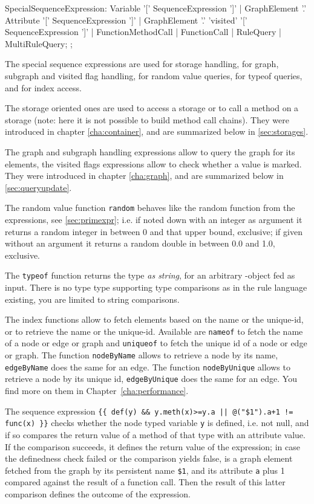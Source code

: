 \begin{rail}
  SpecialSequenceExpression:
    Variable '[' SequenceExpression ']' |
    GraphElement '.' Attribute '[' SequenceExpression ']' |
    GraphElement '.' 'visited' '[' SequenceExpression ']' |
    FunctionMethodCall |
    FunctionCall |
		RuleQuery |
		MultiRuleQuery;
  ;
\end{rail}

The special sequence expressions are used for storage handling, for graph, subgraph and visited flag handling, for random value queries, for typeof queries, and for index access.

The storage oriented ones are used to access a storage or to call a method on a storage (note: here it is not possible to build method call chains). 
They were introduced in chapter \ref{cha:container}, and are summarized below in \ref{sec:storages}.

The graph and subgraph handling expressions allow to query the graph for its elements, the visited flags expressions allow to check whether a value is marked.
They were introduced in chapter \ref{cha:graph}, and are summarized below in \ref{sec:queryupdate}.

The random value function \texttt{random} behaves like the random function from the expressions, see \ref{sec:primexpr};
i.e. if noted down with an integer as argument it returns a random integer in between 0 and that upper bound, exclusive; if given without an argument it returns a random double in between 0.0 and 1.0, exclusive.

The \texttt{typeof} function returns the type \emph{as string}, for an arbitrary \GrG-object fed as input.
There is no type type supporting type comparisons as in the rule language existing, you are limited to string comparisons.

The index functions allow to fetch elements based on the name or the unique-id, or to retrieve the name or the unique-id.
Available are \texttt{nameof} to fetch the name of a node or edge or graph and \texttt{uniqueof} to fetch the unique id of a node or edge or graph.
The function \texttt{nodeByName} allows to retrieve a node by its name, \texttt{edgeByName} does the same for an edge.
The function \texttt{nodeByUnique} allows to retrieve a node by its unique id, \texttt{edgeByUnique} does the same for an edge.
You find more on them in Chapter~\ref{cha:performance}.

\begin{example}
The sequence expression \verb#{{ def(y) && y.meth(x)>=y.a || @("$1").a+1 != func(x) }}# checks whether the node typed variable \texttt{y} is defined, i.e. not null, and if so compares the return value of a method of that type with an attribute value. If the comparison succeeds, it defines the return value of the expression; in case the definedness check failed or the comparison yields false, is a graph element fetched from the graph by its persistent name \verb#$1#, and its attribute \texttt{a} plus 1 compared against the result of a function call. Then the result of this latter comparison defines the outcome of the expression.
\end{example}



